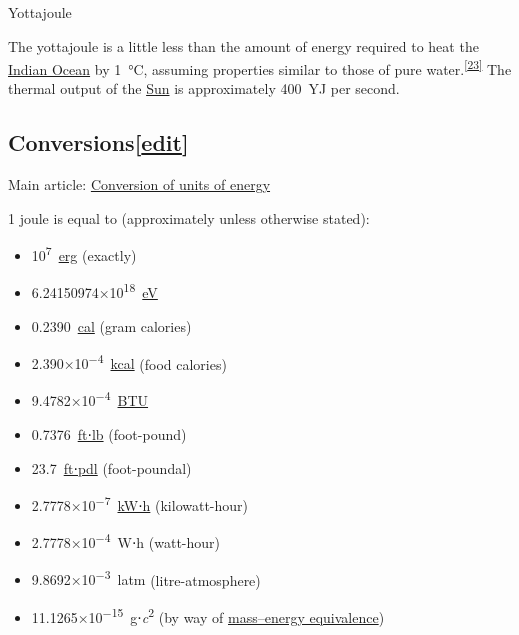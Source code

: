 \documentclass[
]{article}
\providecommand{\tightlist}{%
  \setlength{\itemsep}{0pt}\setlength{\parskip}{0pt}}
\newenvironment{LTR}{\beginL}{\endL}
\begin{document}
\begin{LTR}
\begin{otherlanguage}{english}
{\label{Yottajoule}{}{Yottajoule}}

The yottajoule is a little less than the amount of energy required to
heat the \href{/wiki/Indian_Ocean}{Indian Ocean} by 1~°C, assuming
properties similar to those of pure
water.\textsuperscript{\hyperref[cite_note-Volumes_of_the_Worldux27s_Oceans-24]{{[}23{]}}}
The thermal output of the \href{/wiki/Sun}{Sun} is approximately
{{}400~YJ} per second.

\subsection[{{{[}}\href{/w/index.php?title=Joule&action=edit&section=5}{{edit}}{{]}}}]{\texorpdfstring{\label{Conversions}{Conversions}{{{[}}\href{/w/index.php?title=Joule&action=edit&section=5}{{edit}}{{]}}}}{Conversions{[}edit{]}}}\label{conversionsedit}

Main article: \href{/wiki/Conversion_of_units_of_energy}{Conversion of
units of energy}

1 joule is equal to (approximately unless otherwise stated):

\begin{itemize}
\tightlist
\item
  {{}10\textsuperscript{7}~\href{/wiki/Erg}{erg}} (exactly)
\item
  {{}6.241{509}{74}{×}10\textsuperscript{18}~\href{/wiki/Electronvolt}{eV}}
\item
  {{}0.2390~\href{/wiki/Calorie}{cal}} (gram calories)
\item
  {{}2.390{×}10\textsuperscript{−4}~\href{/wiki/Calorie}{kcal}} (food
  calories)
\item
  {{}9.4782{×}10\textsuperscript{−4}~\href{/wiki/British_thermal_unit}{BTU}}
\item
  {{}0.7376~\href{/wiki/Ft\%E2\%8B\%85lb}{ft⋅lb}} (foot-pound)
\item
  {{}23.7~\href{/wiki/Foot-poundal}{ft⋅pdl}} (foot-poundal)
\item
  {{}2.7778{×}10\textsuperscript{−7}~\href{/wiki/KW\%E2\%8B\%85h}{kW⋅h}}
  (kilowatt-hour)
\item
  {{}2.7778{×}10\textsuperscript{−4}~W⋅h} (watt-hour)
\item
  {{}9.8692{×}10\textsuperscript{−3}~latm} (litre-atmosphere)
\item
  {{}11.1265{×}10\textsuperscript{−15}~g⋅\emph{c}\textsuperscript{2}}
  (by way of
  \href{/wiki/Mass\%E2\%80\%93energy_equivalence}{mass--energy
  equivalence})
\end{itemize}


\end{otherlanguage}
\end{LTR}
\end{document}
